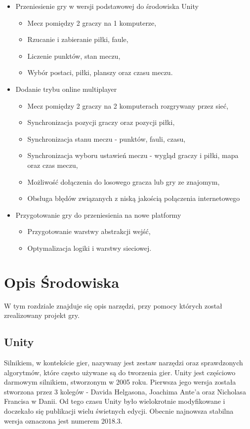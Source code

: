 \documentclass[a4paper,12pt,twoside,openany]{report}
\begin{document}
\begin{itemize}
    \item Przeniesienie gry w wersji podstawowej do środowiska Unity
    \begin{itemize}
        \item Mecz pomiędzy 2 graczy na 1 komputerze,
        \item Rzucanie i zabieranie piłki, faule,
        \item Liczenie punktów, stan meczu,
        \item Wybór postaci, piłki, planszy oraz czasu meczu.
    \end{itemize}
    
    \item Dodanie trybu online multiplayer
    \begin{itemize}
        \item Mecz pomiędzy 2 graczy na 2 komputerach rozgrywany przez sieć,
        \item Synchronizacja pozycji graczy oraz pozycji piłki,
        \item Synchronizacja stanu meczu - punktów, fauli, czasu,
        \item Synchronizacja wyboru ustawień meczu - wygląd graczy i piłki, mapa oraz czas meczu,
        \item Możliwość dołączenia do losowego gracza lub gry ze znajomym,
        \item Obsługa błędów związanych z niską jakością połączenia internetowego
    \end{itemize}
    
    \item Przygotowanie gry do przeniesienia na nowe platformy
    \begin{itemize}
        \item Przygotowanie warstwy abstrakcji wejść,
        \item Optymalizacja logiki i warstwy sieciowej.
    \end{itemize}
\end{itemize}



\chapter{Opis Środowiska}
W tym rozdziale znajduje się opis narzędzi, przy pomocy których został zrealizowany projekt gry.
\section{Unity}
 Silnikiem, w kontekście gier, nazywany jest zestaw narzędzi oraz sprawdzonych algorytmów, które często używane są do tworzenia gier. Unity jest częściowo darmowym silnikiem, stworzonym w 2005 roku. Pierwsza jego wersja została stworzona przez 3 kolegów - Davida Helgasona, Joachima Ante'a oraz Nicholasa Francisa w Danii. Od tego czasu Unity było wielokrotnie modyfikowane i doczekało się publikacji wielu świetnych edycji. Obecnie najnowsza stabilna wersja oznaczona jest numerem 2018.3\cite{unity_wiki}. 
\end{document}
